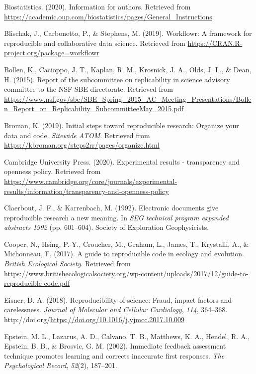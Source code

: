 \documentclass[12pt,twoside]{reedthesis}
\newenvironment{CSLReferences}%
  {}%
  {\par}
\begin{document}
\begin{CSLReferences}{1}{0}
\leavevmode\hypertarget{ref-journal-biostats}{}%
Biostatistics. (2020). Information for authors. Retrieved from \url{https://academic.oup.com/biostatistics/pages/General_Instructions}

\leavevmode\hypertarget{ref-R-workflowr}{}%
Blischak, J., Carbonetto, P., \& Stephens, M. (2019). Workflowr: A framework for reproducible and collaborative data science. Retrieved from \url{https://CRAN.R-project.org/package=workflowr}

\leavevmode\hypertarget{ref-arlington}{}%
Bollen, K., Cacioppo, J. T., Kaplan, R. M., Krosnick, J. A., Olds, J. L., \& Dean, H. (2015). Report of the subcommittee on replicability in science advisory committee to the NSF SBE directorate. Retrieved from \url{https://www.nsf.gov/sbe/SBE_Spring_2015_AC_Meeting_Presentations/Bollen_Report_on_Replicability_SubcommitteeMay_2015.pdf}

\leavevmode\hypertarget{ref-broman}{}%
Broman, K. (2019). Initial steps toward reproducible research: Organize your data and code. \emph{Sitewide ATOM}. Retrieved from \url{https://kbroman.org/steps2rr/pages/organize.html}

\leavevmode\hypertarget{ref-exp-results}{}%
Cambridge University Press. (2020). Experimental results - transparency and openness policy. Retrieved from \url{https://www.cambridge.org/core/journals/experimental-results/information/transparency-and-openness-policy}

\leavevmode\hypertarget{ref-claerbout}{}%
Claerbout, J. F., \& Karrenbach, M. (1992). Electronic documents give reproducible research a new meaning. In \emph{SEG technical program expanded abstracts 1992} (pp. 601--604). Society of Exploration Geophysicists.

\leavevmode\hypertarget{ref-cooper2017guide}{}%
Cooper, N., Hsing, P.-Y., Croucher, M., Graham, L., James, T., Krystalli, A., \& Michonneau, F. (2017). A guide to reproducible code in ecology and evolution. \emph{British Ecological Society}. Retrieved from \url{https://www.britishecologicalsociety.org/wp-content/uploads/2017/12/guide-to-reproducible-code.pdf}

\leavevmode\hypertarget{ref-eisner-reproducibility}{}%
Eisner, D. A. (2018). Reproducibility of science: Fraud, impact factors and carelessness. \emph{Journal of Molecular and Cellular Cardiology}, \emph{114}, 364--368. http://doi.org/\url{https://doi.org/10.1016/j.yjmcc.2017.10.009}

\leavevmode\hypertarget{ref-epstein2002immediate}{}%
Epstein, M. L., Lazarus, A. D., Calvano, T. B., Matthews, K. A., Hendel, R. A., Epstein, B. B., \& Brosvic, G. M. (2002). Immediate feedback assessment technique promotes learning and corrects inaccurate first responses. \emph{The Psychological Record}, \emph{52}(2), 187--201.


\end{CSLReferences}
\end{document}
